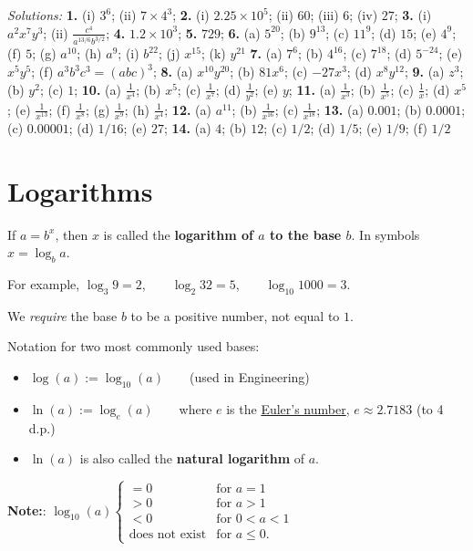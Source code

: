 \documentclass[
  12pt,
  oneside]{book}
\providecommand{\tightlist}{%
  \setlength{\itemsep}{0pt}\setlength{\parskip}{0pt}}
\theoremstyle{definition}
\theoremstyle{definition}
\theoremstyle{definition}
\theoremstyle{definition}
\theoremstyle{remark}
\begin{document}
\emph{Solutions:}
\textbf{1.} (i) \(3^6\); (ii) \(7\times 4^3\);
\textbf{2.} (i) \(2.25\times 10^5\); (ii) \(60\); (iii) \(6\); (iv) \(27\);
\textbf{3.} (i) \(a^2x^7y^3\); (ii) \(\frac{c^4}{a^{13/6}b^{3/2}}\);
\textbf{4.} \(1.2\times 10^3\);
\textbf{5.} \(729\);
\textbf{6.} (a) \(5^{20}\); (b) \(9^{13}\); (c) \(11^9\); (d) \(15\); (e) \(4^9\); (f) \(5\); (g) \(a^{10}\); (h) \(a^9\); (i) \(b^{22}\); (j) \(x^{15}\); (k) \(y^{21}\)
\textbf{7.} (a) \(7^6\); (b) \(4^{16}\); (c) \(7^{18}\); (d) \(5^{-24}\); (e) \(x^5y^5\); (f) \(a^3b^3c^3=(abc)^3\);
\textbf{8.} (a) \(x^{10}y^{20}\); (b) \(81x^6\); (c) \(-27x^3\); (d) \(x^8y^{12}\);
\textbf{9.} (a) \(z^3\); (b) \(y^2\); (c) \(1\);
\textbf{10.} (a) \(\frac{1}{x^4}\); (b) \(x^5\); (c) \(\frac{1}{x^7}\); (d) \(\frac{1}{y^2}\); (e) \(y\);
\textbf{11.} (a) \(\frac{1}{x^3}\); (b) \(\frac{1}{x^5}\); (c) \(\frac{1}{x}\); (d) \(x^5\); (e) \(\frac{1}{x^{13}}\); (f) \(\frac{1}{x^8}\); (g) \(\frac{1}{x^9}\); (h) \(\frac{1}{x^4}\);
\textbf{12.} (a) \(a^{11}\); (b) \(\frac{1}{x^{16}}\); (c) \(\frac{1}{x^{18}}\);
\textbf{13.} (a) \(0.001\); (b) \(0.0001\); (c) \(0.00001\); (d) \(1/16\); (e) \(27\);
\textbf{14.} (a) \(4\); (b) \(12\); (c) \(1/2\); (d) \(1/5\); (e) \(1/9\); (f) \(1/2\)

\chapter{Logarithms}\label{logarithms}

If \(a=b^x\), then \(x\) is called the \textbf{logarithm of \(a\) to the base \(b\)}. In symbols \(x=\log_b a\).

For example, \(\log_3 9=2\), ~ ~ \(\log_2 32=5\), ~ ~ \(\log_{10} 1000=3\).

We \emph{require} the base \(b\) to be a positive number, not equal to \(1\).

Notation for two most commonly used bases:

\begin{itemize}
\tightlist
\item
  \(\log(a) := \log_{10}(a)\) ~ ~ (used in Engineering)
\item
  \(\ln(a) := \log_e(a)\) ~ ~ where \(e\) is the \href{https://en.wikipedia.org/wiki/E_(mathematical_constant)}{Euler's number}, \(e \approx 2.7183\) (to 4 d.p.)
\item
  \(\ln(a)\) is also called the \textbf{natural logarithm} of \(a\).
\end{itemize}

\textbf{Note:}: \(\log_{10}(a) \begin{cases} =0 & \text{for }a=1\\ >0& \text{for }a>1\\ <0 &\text{for }0<a<1\\\text{does not exist}&\text{for }a\leq0.\end{cases}\)
\end{document}
